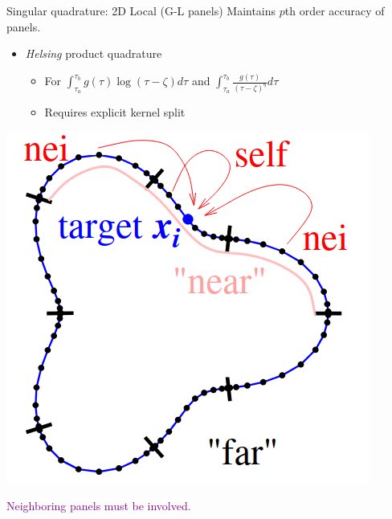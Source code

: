 \documentclass[t]{beamer}
\newcommand{\com}[1]{{\scriptsize \textcolor{purple}{#1}}}      %
\newcommand{\vg}{\vspace{2ex}}
\newcommand{\hg}{\vspace{0.5ex}}
\begin{document}
\begin{noframe}{Singular quadrature: 2D Local (G-L panels)}
Maintains $p$th order accuracy of panels.
\hg
\begin{itemize}
\item \emph{Helsing} product quadrature
  \begin{itemize}
  \item For
    $\int_{\tau_a}^{\tau_b} g(\tau)\log(\tau-\zeta)d\tau$
    and
    $\int_{\tau_a}^{\tau_b} \frac{g(\tau)}{(\tau-\zeta)^q} d\tau$
  \item Requires explicit kernel split
  \end{itemize}
\end{itemize}

\vg
\begin{center}
  \includegraphics[height=0.3\textwidth]{fig/panels_nearfar}

  \com{Neighboring panels must be involved.}
\end{center}
\end{noframe}
\end{document}
